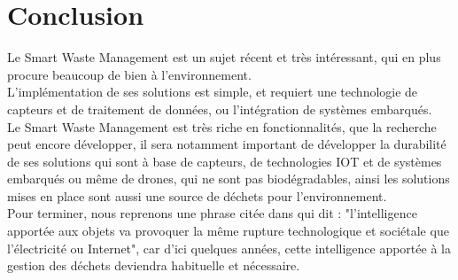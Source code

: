 \documentclass[a4paper,12pt]{report}
\begin{document}
\chapter*{Conclusion}
Le Smart Waste Management est un sujet récent et très intéressant, qui en plus procure beaucoup de bien à l'environnement.\\
L'implémentation de ses solutions est simple, et requiert une technologie de capteurs et de traitement de données, ou l'intégration de systèmes embarqués.\\
Le Smart Waste Management est très riche en fonctionnalités, que la recherche peut encore développer, il sera notamment important de développer la durabilité de ses solutions qui sont à base de capteurs, de technologies IOT et de systèmes embarqués ou même de drones, qui ne sont pas biodégradables, ainsi les solutions mises en place sont aussi une source de déchets pour l'environnement.\\ 
Pour terminer, nous reprenons une phrase citée dans \cite{ref12} qui dit : "l’intelligence apportée aux objets va provoquer la même rupture technologique et sociétale que l’électricité ou Internet", car d'ici quelques années, cette intelligence apportée à la gestion des déchets deviendra habituelle et nécessaire.




\tableofcontents

\listoffigures


\end{document}
